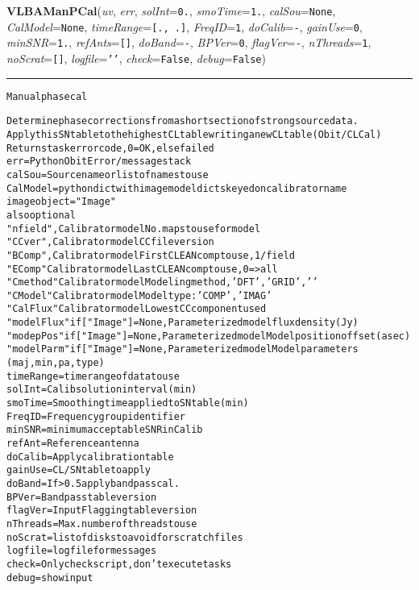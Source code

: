     \begin{boxedminipage}{\textwidth}

    \raggedright \textbf{VLBAManPCal}(\textit{uv}, \textit{err}, \textit{solInt}=\texttt{0\-.\-}, \textit{smoTime}=\texttt{1\-.\-}, \textit{calSou}=\texttt{N\-o\-n\-e\-}, \textit{CalModel}=\texttt{N\-o\-n\-e\-}, \textit{timeRange}=\texttt{[\-.\-,\-~\-.\-]\-}, \textit{FreqID}=\texttt{1\-}, \textit{doCalib}=\texttt{-\-}, \textit{gainUse}=\texttt{0\-}, \textit{minSNR}=\texttt{1\-.\-}, \textit{refAnts}=\texttt{[\-]\-}, \textit{doBand}=\texttt{-\-}, \textit{BPVer}=\texttt{0\-}, \textit{flagVer}=\texttt{-\-}, \textit{nThreads}=\texttt{1\-}, \textit{noScrat}=\texttt{[\-]\-}, \textit{logfile}=\texttt{'\-'\-}, \textit{check}=\texttt{F\-a\-l\-s\-e\-}, \textit{debug}=\texttt{F\-a\-l\-s\-e\-})

    \vspace{-1.5ex}

    \rule{\textwidth}{0.5\fboxrule}
\begin{alltt}
Manual phase cal

Determine phase corrections from a short section of strong source data.
Apply this SN table to the highest CL table writing a new CL table (Obit/CLCal)
Returns task error code, 0=OK, else failed
err        = Python Obit Error/message stack
calSou     = Source name or list of names to use
CalModel = python dict with image model dicts keyed on calibrator name
           image object = "Image"
           also optional
           "nfield",    Calibrator model  No. maps to use for model
           "CCver",     Calibrator model CC file version
           "BComp",     Calibrator model First CLEAN comp to use, 1/field
           "EComp"      Calibrator model  Last CLEAN comp to use, 0={\textgreater}all
           "Cmethod"    Calibrator model Modeling method, 'DFT','GRID','    '
           "CModel"     Calibrator model Model type: 'COMP','IMAG'
           "CalFlux"    Calibrator model  Lowest CC component used
           "modelFlux"  if ["Image"]=None, Parameterized model flux density (Jy)
           "modepPos"   if ["Image"]=None, Parameterized model Model position offset (asec)
           "modelParm"  if ["Image"]=None, Parameterized model Model parameters
                        (maj, min, pa, type)
timeRange  = timerange of data to use
solInt     = Calib solution interval (min)
smoTime    = Smoothing time applied to SN table (min)
FreqID     = Frequency group identifier
minSNR     = minimum acceptable SNR in Calib
refAnt   = Reference antenna
doCalib    = Apply calibration table
gainUse    = CL/SN table to apply
doBand     = If {\textgreater}0.5 apply bandpass cal.
BPVer      = Bandpass table version
flagVer    = Input Flagging table version
nThreads   = Max. number of threads to use
noScrat    = list of disks to avoid for scratch files
logfile    = logfile for messages
check      = Only check script, don't execute tasks
debug      = show input\end{alltt}

    \vspace{1ex}

    \end{boxedminipage}

